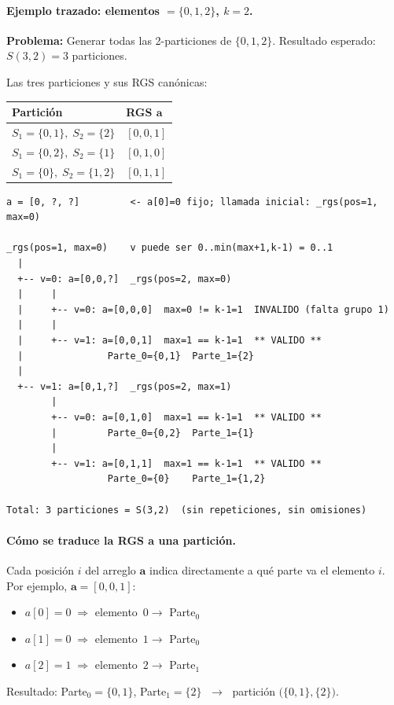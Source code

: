\documentclass[12pt,letterpaper]{article}
\theoremstyle{definition}
\theoremstyle{remark}
\newcommand{\Stir}[2]{S(#1,#2)}
\begin{document}
\paragraph{Ejemplo trazado: elementos $= \{0,1,2\}$, $k = 2$.}

\begin{blueBox}
\textbf{Problema:} Generar todas las 2-particiones de $\{0,1,2\}$.
Resultado esperado: $\Stir{3}{2} = 3$ particiones.

\medskip
Las tres particiones y sus RGS canónicas:
\begin{center}
\begin{tabular}{@{}l l@{}}
\toprule
\textbf{Partición} & \textbf{RGS} $\mathbf{a}$ \\
\midrule
$S_1=\{0,1\},\; S_2=\{2\}$ & $[0, 0, 1]$ \\
$S_1=\{0,2\},\; S_2=\{1\}$ & $[0, 1, 0]$ \\
$S_1=\{0\},\;   S_2=\{1,2\}$ & $[0, 1, 1]$ \\
\bottomrule
\end{tabular}
\end{center}
\end{blueBox}

\begin{lstlisting}[style=pseudocode,
  caption={Árbol de recursión de \texttt{\_rgs([0,1,2], k=2)} --- 3 hojas válidas},
  label=lst:rgs-trace]
a = [0, ?, ?]         <- a[0]=0 fijo; llamada inicial: _rgs(pos=1, max=0)

_rgs(pos=1, max=0)    v puede ser 0..min(max+1,k-1) = 0..1
  |
  +-- v=0: a=[0,0,?]  _rgs(pos=2, max=0)
  |     |
  |     +-- v=0: a=[0,0,0]  max=0 != k-1=1  INVALIDO (falta grupo 1)
  |     |
  |     +-- v=1: a=[0,0,1]  max=1 == k-1=1  ** VALIDO **
  |               Parte_0={0,1}  Parte_1={2}
  |
  +-- v=1: a=[0,1,?]  _rgs(pos=2, max=1)
        |
        +-- v=0: a=[0,1,0]  max=1 == k-1=1  ** VALIDO **
        |         Parte_0={0,2}  Parte_1={1}
        |
        +-- v=1: a=[0,1,1]  max=1 == k-1=1  ** VALIDO **
                  Parte_0={0}    Parte_1={1,2}

Total: 3 particiones = S(3,2)  (sin repeticiones, sin omisiones)
\end{lstlisting}

\paragraph{Cómo se traduce la RGS a una partición.}
Cada posición $i$ del arreglo $\mathbf{a}$ indica directamente a qué parte va
el elemento $i$. Por ejemplo, $\mathbf{a} = [0, 0, 1]$:
\begin{itemize}
  \item $a[0] = 0 \;\Rightarrow$ elemento~$0 \to$ Parte$_0$
  \item $a[1] = 0 \;\Rightarrow$ elemento~$1 \to$ Parte$_0$
  \item $a[2] = 1 \;\Rightarrow$ elemento~$2 \to$ Parte$_1$
\end{itemize}
Resultado: Parte$_0 = \{0,1\}$, Parte$_1 = \{2\}$
$\;\longrightarrow\;$ partición $\bigl(\{0,1\},\{2\}\bigr)$.
\end{document}
